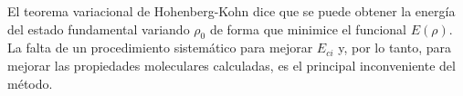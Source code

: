 El teorema variacional de Hohenberg-Kohn dice que se puede obtener la
energ\'ia del estado fundamental variando $\rho_0$ de forma que 
minimice el funcional $E(\rho)$. La falta de un procedimiento 
sistem\'atico para mejorar $E_{ci}$ y, por lo tanto, para mejorar las
propiedades moleculares calculadas, es el principal inconveniente del 
m\'etodo.
